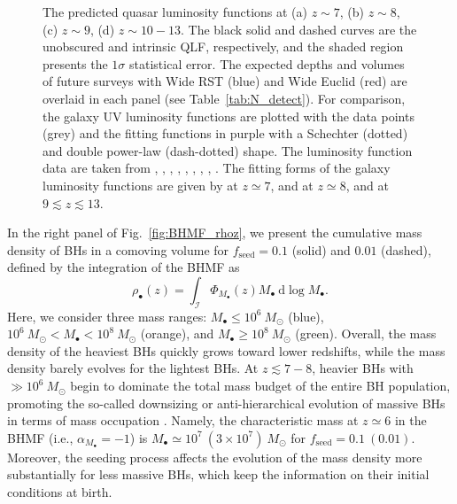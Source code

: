 \documentclass[twocolumn, twocolappendix]{aastex63}
\newcommand{\Msun}{M_\odot}
\newcommand{\Mbh}{M_\bullet}
\newcommand{\fseed}{f_\mathrm{seed}}
\newcommand{\D}{\mathrm{d}}
\begin{document}
\begin{CJK*}{UTF8}{gbsn}
\begin{figure}
\caption{
The predicted quasar luminosity functions at (a) $z\sim 7$, (b) $z\sim 8$, (c) $z\sim 9$, (d) $z\sim 10-13$.
The black solid and dashed curves are the unobscured and intrinsic QLF, respectively, and the shaded region presents the $1\sigma$ statistical error.
The expected depths and volumes of future surveys with Wide RST (blue) and Wide Euclid (red) are overlaid in each panel (see Table~\ref{tab:N_detect}).
For comparison, the galaxy UV luminosity functions are plotted with the data points (grey) and the fitting functions in purple with a Schechter (dotted) and double power-law (dash-dotted) shape.
The luminosity function data are taken from \citet{2013MNRAS.432.2696M}, \citet{2016ApJ...819..129O}, \citet{2018ApJ...867..150M},
\citet{2019ApJ...883...99S}, \citet{2020MNRAS.493.2059B}, \citet{2021AJ....162...47B},
\citet{2022ApJS..259...20H,Harikane_2022b,Harikane_2022c}, \citet{2022arXiv220712356D}, \citet{2022arXiv220709434N}.
The fitting forms of the galaxy luminosity functions are given by \citet{2022ApJS..259...20H} at $z\simeq 7$, 
\citet{2020MNRAS.493.2059B} and \citet{2013MNRAS.432.2696M} at $z\simeq 8$, and \citet{Harikane_2022c} at $9\lesssim z\lesssim 13$.}
\label{fig:LFs}
\vspace{5mm}
\end{figure}



In the right panel of Fig.~\ref{fig:BHMF_rhoz}, we present the cumulative mass density of BHs in a comoving volume
for $\fseed=0.1$ (solid) and $0.01$ (dashed),
defined by the integration of the BHMF as
%
\begin{equation}
 \rho_\bullet(z)=\int_{\mathcal{I}} \Phi_{\Mbh} (z) \Mbh ~\D \log \Mbh.
\end{equation}
%
Here, we consider three mass ranges: $M_\bullet \leq 10^6~\Msun$ (blue), $10^6~\Msun < M_\bullet < 10^8~\Msun$ (orange),
and $M_\bullet \geq 10^8~\Msun$ (green).
Overall, the mass density of the heaviest BHs quickly grows toward lower redshifts,
while the mass density barely evolves for the lightest BHs.
At $z\lesssim 7-8$, heavier BHs with $\gg 10^6~\Msun$ begin to dominate the total mass budget of the entire BH population,
promoting the so-called downsizing or anti-hierarchical evolution of massive BHs 
in terms of mass occupation \citep[e.g.,][]{2014ApJ...786..104U}.
Namely, the characteristic mass at $z\simeq 6$ in the BHMF (i.e., $\alpha_{M_\bullet}=-1$) is $M_\bullet \simeq 10^7~(3\times 10^7)~\Msun$ for 
$\fseed=0.1~(0.01)$.
Moreover, the seeding process affects the evolution of the mass density more substantially for less massive BHs,
which keep the information on their initial conditions at birth.




\end{CJK*}
\end{document}
